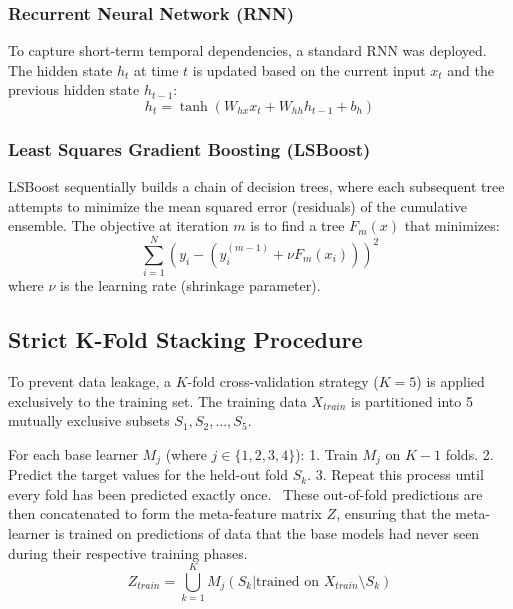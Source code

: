 \documentclass[conference]{IEEEtran}
\begin{document}
\subsubsection{Recurrent Neural Network (RNN)}
To capture short-term temporal dependencies, a standard RNN was deployed. The hidden state $h_t$ at time $t$ is updated based on the current input $x_t$ and the previous hidden state $h_{t-1}$:
\begin{equation}
h_t = \tanh(W_{hx} x_t + W_{hh} h_{t-1} + b_h)
\end{equation}

\subsubsection{Least Squares Gradient Boosting (LSBoost)}
LSBoost sequentially builds a chain of decision trees, where each subsequent tree attempts to minimize the mean squared error (residuals) of the cumulative ensemble. The objective at iteration $m$ is to find a tree $F_m(x)$ that minimizes:
\begin{equation}
\sum_{i=1}^N \left( y_i - \left( \hat{y}_i^{(m-1)} + \nu F_m(x_i) \right) \right)^2
\end{equation}
where $\nu$ is the learning rate (shrinkage parameter).

\subsection{Strict K-Fold Stacking Procedure}
To prevent data leakage, a $K$-fold cross-validation strategy ($K=5$) is applied exclusively to the training set. The training data $X_{train}$ is partitioned into 5 mutually exclusive subsets $S_1, S_2, ..., S_5$. 

For each base learner $M_j$ (where $j \in \{1, 2, 3, 4\}$):
1. Train $M_j$ on $K-1$ folds.
2. Predict the target values for the held-out fold $S_k$.
3. Repeat this process until every fold has been predicted exactly once. 
These out-of-fold predictions are then concatenated to form the meta-feature matrix $Z$, ensuring that the meta-learner is trained on predictions of data that the base models had never seen during their respective training phases.
\begin{equation}
Z_{train} = \bigcup_{k=1}^K M_j(S_k | \text{trained on } X_{train} \setminus S_k)
\end{equation}
\end{document}
